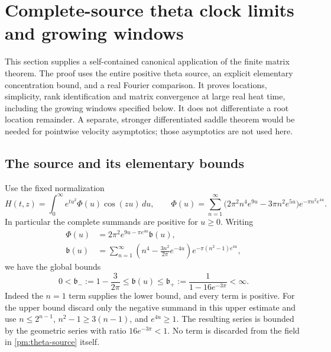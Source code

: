 
\section{Complete-source theta clock limits and growing windows}
\label{pm:theta-section}
\label{th:section}

This section supplies a self-contained canonical application of the finite
matrix theorem.  The proof uses the entire positive theta source, an
explicit elementary concentration bound, and a real Fourier comparison.
It proves locations, simplicity, rank identification and matrix
convergence at large real heat time, including the growing windows
specified below. It does not differentiate a root
location remainder.  A separate, stronger differentiated saddle theorem
would be needed for pointwise velocity asymptotics; those asymptotics are
not used here.

\subsection{The source and its elementary bounds}
\label{pm:theta-source-subsection}

Use the fixed normalization
\begin{equation}
 H(t,z)=\int_0^\infty e^{tu^2}\Phi(u)\cos(zu)\,du,
 \qquad
 \Phi(u)=\sum_{n=1}^\infty
       \bigl(2\pi^2n^4e^{9u}-3\pi n^2e^{5u}\bigr)
                         e^{-\pi n^2e^{4u}}.
 \label{pm:theta-source}
\end{equation}
In particular the complete summands are positive for \(u\ge0\).
Writing
\begin{align}
 \Phi(u)&=2\pi^2e^{9u-\pi e^{4u}}\mathfrak b(u),
 \label{pm:theta-factorization}\\
 \mathfrak b(u)
  &=\sum_{n=1}^\infty
       \left(n^4-\frac{3n^2}{2\pi}e^{-4u}\right)
                       e^{-\pi(n^2-1)e^{4u}},
 \label{pm:theta-b-definition}
\end{align}
we have the global bounds
\begin{equation}
 0<\mathfrak b_-:=1-\frac3{2\pi}
 \le\mathfrak b(u)\le
 \mathfrak b_+:=\frac1{1-16e^{-3\pi}}<\infty.
 \label{pm:theta-b-bounds}
\end{equation}
Indeed the \(n=1\) term supplies the lower bound, and every term is
positive.  For the upper bound discard only the negative summand in this
upper estimate and use
\(n\le2^{n-1}\), \(n^2-1\ge3(n-1)\), and \(e^{4u}\ge1\).
The resulting series is bounded by the geometric series with ratio
\(16e^{-3\pi}<1\).  No term is discarded from the field in
\eqref{pm:theta-source} itself.

